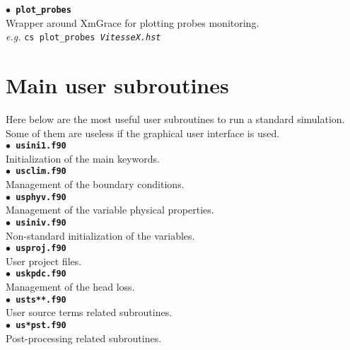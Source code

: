 \documentclass[a4paper,11pt]{article}
\newcommand{\refword}[1]{\texttt{$\bullet$ \bf{#1}}}
\begin{document}
\begin{multicols*}{3}
\refword{plot\_probes}\\
Wrapper around XmGrace for plotting probes monitoring.\\
\textit{e.g.} \texttt{cs plot\_probes \emph{VitesseX.hst}}


\section*{Main user subroutines}

Here below are the most useful user subroutines to run a standard
simulation. Some of them are useless if the graphical user interface
is used.\\

\refword{usini1.f90}\\
Initialization of the main keywords.\\

\refword{usclim.f90}\\
Management of the boundary conditions.\\

\refword{usphyv.f90}\\
Management of the variable physical properties.\\

\refword{usiniv.f90}\\
Non-standard initialization of the variables.\\

\refword{usproj.f90}\\
User project files.\\

\refword{uskpdc.f90}\\
Management of the head loss.\\

\refword{usts**.f90}\\
User source terms related subroutines.\\

\refword{us*pst.f90}\\
Post-processing related subroutines.\\





\end{multicols*}
\end{document}
